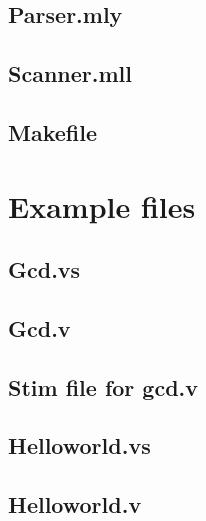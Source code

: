 \documentclass[letterpaper,11pt]{article}
\begin{document}
\subsection{Parser.mly}

\subsection{Scanner.mll}

\subsection{Makefile}


\section{Example files}
\subsection{Gcd.vs}

\subsection{Gcd.v}

\subsection{Stim file for gcd.v}

\subsection{Helloworld.vs}

\subsection{Helloworld.v}

\end{document}
